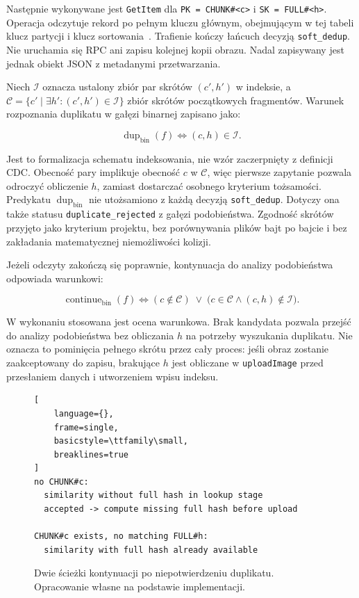 Następnie wykonywane jest \texttt{GetItem} dla
\texttt{PK = CHUNK\#<c>} i \texttt{SK = FULL\#<h>}.
Operacja odczytuje rekord po pełnym kluczu głównym, obejmującym
w tej tabeli klucz partycji i klucz sortowania~\cite{awsGetItem}.
Trafienie kończy łańcuch decyzją \texttt{soft\_dedup}.
Nie uruchamia się RPC ani zapisu kolejnej kopii obrazu.
Nadal zapisywany jest jednak obiekt JSON z metadanymi przetwarzania.

Niech \(\mathcal{I}\) oznacza ustalony zbiór par skrótów
\((c',h')\) w indeksie, a
\(\mathcal{C}=\{c'\mid \exists h':(c',h')\in\mathcal{I}\}\)
zbiór skrótów początkowych fragmentów.
Warunek rozpoznania duplikatu w gałęzi binarnej zapisano jako:

\begin{equation}
\label{eq:soft-dedup}
\operatorname{dup}_{\mathrm{bin}}(f)
\iff (c,h)\in\mathcal{I}.
\end{equation}

Jest to formalizacja schematu indeksowania, nie wzór zaczerpnięty
z definicji CDC. Obecność pary implikuje obecność \(c\)
w \(\mathcal{C}\), więc pierwsze zapytanie pozwala odroczyć
obliczenie \(h\), zamiast dostarczać osobnego kryterium tożsamości.
Predykatu \(\operatorname{dup}_{\mathrm{bin}}\) nie utożsamiono
z każdą decyzją \texttt{soft\_dedup}.
Dotyczy ona także statusu \texttt{duplicate\_rejected}
z gałęzi podobieństwa.
Zgodność skrótów przyjęto jako kryterium projektu, bez porównywania
plików bajt po bajcie i bez zakładania matematycznej niemożliwości
kolizji.

Jeżeli odczyty zakończą się poprawnie, kontynuacja do analizy
podobieństwa odpowiada warunkowi:

\begin{equation}
\label{eq:full-hash-continue}
\operatorname{continue}_{\mathrm{bin}}(f)
\iff
(c\notin\mathcal{C})
\;\lor\;
\bigl(c\in\mathcal{C}\land(c,h)\notin\mathcal{I}\bigr).
\end{equation}

W wykonaniu stosowana jest ocena warunkowa.
Brak kandydata pozwala przejść do analizy podobieństwa bez obliczania
\(h\) na potrzeby wyszukania duplikatu. Nie oznacza to pominięcia
pełnego skrótu przez cały proces: jeśli obraz zostanie zaakceptowany
do zapisu, brakujące \(h\) jest obliczane w \texttt{uploadImage}
przed przesłaniem danych i utworzeniem wpisu indeksu.

\begin{figure}[!htbp]
\centering
\begin{lstlisting}[
    language={},
    frame=single,
    basicstyle=\ttfamily\small,
    breaklines=true
]
no CHUNK#c:
  similarity without full hash in lookup stage
  accepted -> compute missing full hash before upload

CHUNK#c exists, no matching FULL#h:
  similarity with full hash already available
\end{lstlisting}
\caption{Dwie ścieżki kontynuacji po niepotwierdzeniu duplikatu.
Opracowanie własne na podstawie implementacji.}
\label{fig:full-hash-continue-algo}
\end{figure}

